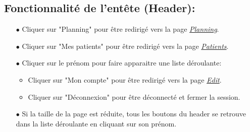 \documentclass[a4paper]{report}
\begin{document}
\subsection{Fonctionnalité de l'entête (Header):}
    \begin{itemize}
        \item[$\bullet$] Cliquer sur "Planning" pour être redirigé vers la page \textit{\hyperref[planning]{Planning}}.
        \item[$\bullet$] Cliquer sur "Mes patients" pour être redirigé vers la page \textit{\hyperref[patients]{Patients}}.
        \item[$\bullet$] Cliquer sur le prénom pour faire apparaitre une liste déroulante:
            \begin{itemize}
                \item Cliquer sur "Mon compte" pour être redirigé vers la page \textit{\hyperref[edit2]{Edit}}.
                \item Cliquer sur "Déconnexion" pour être déconnecté et fermer la session.
            \end{itemize}
        \item[$\bullet$] Si la taille de la page est réduite, tous les boutons du header se retrouve dans la liste déroulante en cliquant sur son prénom.
    \end{itemize}
    \vspace{3mm}
    
\end{document}

